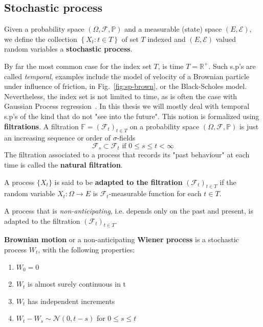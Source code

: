 \subsection{Stochastic process}
\begin{definition}
		Given a probability space $(\Omega, \mathcal{F}, \mathbb{P})$ and a measurable (state) space $(E, \mathcal{E})$, we define the collection $\left\{X_{t}: t \in T\right\}$ of set $T$ indexed and $(E, \mathcal{E})$ valued random variables a \textbf{stochastic process}.
\end{definition}
By far the most common case for the index set $T$, is time $T = \mathbb{R}^+$. Such s.p's are called \emph{temporal}, examples include the model of velocity of a Brownian particle under influence of friction, in Fig.~\ref{fig:sp-brown}, or the Black-Scholes model. Nevertheless, the index set is not limited to time, as is often the case with Gaussian Process regression~\cite{rasmussen2006gaussian}. In this thesis we will mostly deal with temporal s.p's of the kind that do not "see into the future". This notion is formalized using \textbf{filtrations}. A filtration $\mathbb{F}=\left(\mathcal{F}_{t}\right)_{t \in T}$ on a probability space $(\Omega, \mathcal{F}, \mathbb{P})$ is just an increasing sequence or order of $\sigma$-fields
\begin{equation}
	\mathcal{F}_{s} \subset \mathcal{F}_{t} \text { if } 0 \leq s \leq t<\infty
\end{equation}
The filtration associated to a process that records its "past behaviour" at each time is called the \textbf{natural filtration}. 
\begin{definition}
	A process $\{X_t\}$ is said to be \textbf{adapted to the filtration} $\left(\mathcal{F}_{t}\right)_{t \in T}$ if the random variable $X_t : \Omega \rightarrow E$ is $\mathcal{F}_t$-measurable function for each $t \in T$. 
\end{definition}
A process that is \emph{non-anticipating}, i.e. depends only on the past and present, is adapted to the filtration $\left(\mathcal{F}_{t}\right)_{t \in T}$.
\begin{definition}
	\textbf{Brownian motion} or a non-anticipating \textbf{Wiener process} is a stochastic process $W_t$, with the following properties:
	\begin{enumerate}[label=\roman*]
		\item $W_0 = 0$
		\item $W_t$ is almost surely continuous in t
		\item $W_t$ has independent increments
		\item $W_t - W_s \sim \mathcal{N} (0, t-s)$ for $0 \leq s \leq t$
	\end{enumerate}
\end{definition}
